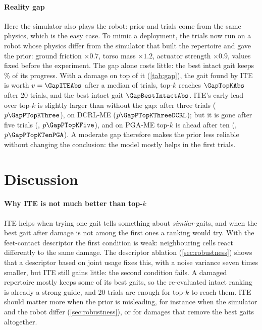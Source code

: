 \documentclass[11pt,a4paper]{article}
\newcommand{\PGA}{PGA-ME}
\newcommand{\DCRL}{DCRL-ME}
\begin{document}
\paragraph{Reality gap} Here the simulator also plays the robot: prior and trials come from the same physics, which
is the easy case. To mimic a deployment, the trials now run on a robot whose physics differ from the simulator that
built the repertoire and gave the prior: ground friction $\times0.7$, torso mass $\times1.2$, actuator strength
$\times0.9$, values fixed before the experiment. The gap alone costs little: the best intact gait keeps
\GapIntactRetained\% of its progress. With a damage on top of it (\cref{tab:gap}), the gait found by ITE is worth
$v=\GapITEAbs$ after a median of \GapITETrials{} trials, top-$k$ reaches $\GapTopKAbs$ after 20 trials, and the best
intact gait $\GapBestIntactAbs$. ITE's early lead over top-$k$ is slightly larger than without the gap: \GapDiffTopKThree{} after three trials
($p\GapPTopKThree$), \GapDiffTopKThreeDCRL{} on \DCRL{} ($p\GapPTopKThreeDCRL$); but it is gone after five trials
(\GapDiffTopKFive, $p\GapPTopKFive$), and on \PGA{} top-$k$ is ahead after ten (\GapDiffTopKTenPGA,
$p\GapPTopKTenPGA$). A moderate gap therefore makes the prior less reliable without changing the conclusion: the model
mostly helps in the first trials.

\begin{table}[htbp]
\centering\small
\caption{Adaptation with a reality gap: prior from the nominal simulator, trials on the perturbed robot (medians over
repertoires, damages and repetitions; ``\% intact'': share of the progress of the best intact gait of the perturbed
robot).}
\label{tab:gap}

\end{table}

\FloatBarrier
\section{Discussion}\label{sec:discussion}
\paragraph{Why ITE is not much better than top-$k$} ITE helps when trying one gait tells something about
\emph{similar} gaits, and when the best gait after damage is not among the first ones a ranking would try. With the
feet-contact descriptor the first condition is weak: neighbouring cells react differently to the same damage. The
descriptor ablation (\cref{sec:robustness}) shows that a descriptor based on joint usage fixes this, with a noise
variance seven times smaller, but ITE still gains little: the second condition fails. A damaged repertoire mostly keeps
some of its best gaits, so the re-evaluated intact ranking is already a strong guide, and 20 trials are enough for
top-$k$ to reach them. ITE should matter more when the prior is misleading, for instance when the simulator and the
robot differ (\cref{sec:robustness}), or for damages that remove the best gaits altogether.
\end{document}
